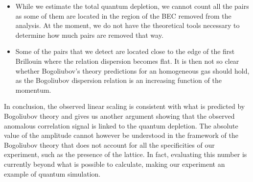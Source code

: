 \begin{itemize}
    \item While we estimate the total quantum depletion, we cannot count all the pairs as some of them are located in the region of the BEC removed from the analysis. At the moment, we do not have the theoretical tools necessary to determine how much pairs are removed that way.
    \item Some of the pairs that we detect are located close to the edge of the first Brillouin where the relation dispersion becomes flat. It is then not so clear whether Bogoliubov's theory predictions for an homogeneous gas should hold, as the Bogoliubov dispersion relation is an increasing function of the momentum.
\end{itemize}

\begin{table}[]
    \centering
    {
    }
    \caption{Average number of detected \kmk pairs per experimental run and fraction of quantum depleted atoms in the depletion for different total atom numbers.}
    \label{tab:nb_pairs}
\end{table}



In conclusion, the observed linear scaling is consistent with what is predicted by Bogoliubov theory and gives us another argument showing that the observed anomalous correlation signal is linked to the quantum depletion. The absolute value of the amplitude cannot however be understood in the framework of the Bogoliubov theory that does not account for all the specificities of our experiment, such as the presence of the lattice. In fact, evaluating this number is currently beyond what is possible to calculate, making our experiment an example of quantum simulation.



